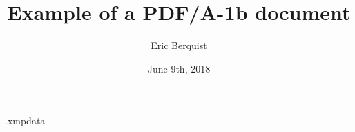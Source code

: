 \begin{filecontents*}{\jobname.xmpdata}
\end{filecontents*}

\documentclass[12pt]{article}

\usepackage{lipsum}
\makeatletter
\newcommand\singlelipsum[1]{%
  \begingroup\let\lips@par\relax\csname lipsum@\@roman{#1}\endcsname
\endgroup }
\makeatother

\usepackage{hyperref}

\usepackage[a-1b]{pdfx}

\title{Example of a PDF/A-1b document}
\author{Eric Berquist}
\date{June 9th, 2018}


\maketitle
\singlelipsum{1}
\singlelipsum{2}

